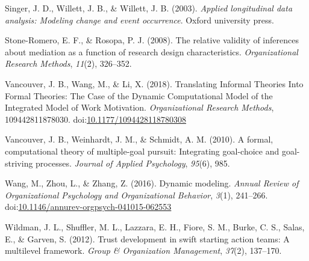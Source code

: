 \documentclass[english,,man]{apa6}
\theoremstyle{definition}
\theoremstyle{definition}
\theoremstyle{definition}
\theoremstyle{remark}
\begin{document}
\leavevmode\hypertarget{ref-singer_applied_2003}{}%
Singer, J. D., Willett, J. B., \& Willett, J. B. (2003). \emph{Applied
longitudinal data analysis: Modeling change and event occurrence}.
Oxford university press.

\leavevmode\hypertarget{ref-stone2008relative}{}%
Stone-Romero, E. F., \& Rosopa, P. J. (2008). The relative validity of
inferences about mediation as a function of research design
characteristics. \emph{Organizational Research Methods}, \emph{11}(2),
326--352.

\leavevmode\hypertarget{ref-vancouver_translating_2018}{}%
Vancouver, J. B., Wang, M., \& Li, X. (2018). Translating Informal
Theories Into Formal Theories: The Case of the Dynamic Computational
Model of the Integrated Model of Work Motivation. \emph{Organizational
Research Methods}, 109442811878030.
doi:\href{https://doi.org/10.1177/1094428118780308}{10.1177/1094428118780308}

\leavevmode\hypertarget{ref-vancouver2010formal}{}%
Vancouver, J. B., Weinhardt, J. M., \& Schmidt, A. M. (2010). A formal,
computational theory of multiple-goal pursuit: Integrating goal-choice
and goal-striving processes. \emph{Journal of Applied Psychology},
\emph{95}(6), 985.

\leavevmode\hypertarget{ref-Wang2016}{}%
Wang, M., Zhou, L., \& Zhang, Z. (2016). Dynamic modeling. \emph{Annual
Review of Organizational Psychology and Organizational Behavior},
\emph{3}(1), 241--266.
doi:\href{https://doi.org/10.1146/annurev-orgpsych-041015-062553}{10.1146/annurev-orgpsych-041015-062553}

\leavevmode\hypertarget{ref-wildman2012trust}{}%
Wildman, J. L., Shuffler, M. L., Lazzara, E. H., Fiore, S. M., Burke, C.
S., Salas, E., \& Garven, S. (2012). Trust development in swift starting
action teams: A multilevel framework. \emph{Group \& Organization
Management}, \emph{37}(2), 137--170.
\end{document}

